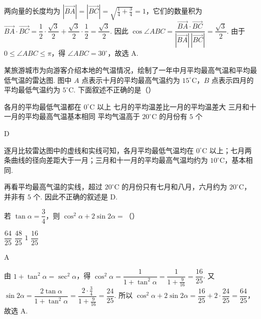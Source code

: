 \begin{solution}
两向量的长度均为 \(|\overrightarrow{BA}|=|\overrightarrow{BC}|=\sqrt{\frac14+\frac34}=1\)，它们的数量积为 \(\overrightarrow{BA}\cdot\overrightarrow{BC}=\dfrac12\cdot\dfrac{\sqrt3}{2}+\dfrac{\sqrt3}{2}\cdot\dfrac12=\dfrac{\sqrt3}{2}\). 因此 \(\cos\angle ABC=\dfrac{\overrightarrow{BA}\cdot\overrightarrow{BC}}{|\overrightarrow{BA}|\,|\overrightarrow{BC}|}=\dfrac{\sqrt3}{2}\). 由于 \(0\le\angle ABC\le\pi\)，得 \(\angle ABC=30^\circ\)，故选 A.
\end{solution}

\begin{problem}
某旅游城市为向游客介绍本地的气温情况，绘制了一年中月平均最高气温和平均最低气温的雷达图. 图中 \(A\) 点表示十月的平均最高气温约为 \(15^\circ\mathrm{C}\)，\(B\) 点表示四月的平均最低气温约为 \(5^\circ\mathrm{C}\). 下面叙述不正确的是（\quad）

\begingroup
{}
\endgroup

\choices
    {各月的平均最低气温都在 \(0^\circ\mathrm{C}\) 以上}
    {七月的平均温差比一月的平均温差大}
    {三月和十一月的平均最高气温基本相同}
    {平均气温高于 \(20^\circ\mathrm{C}\) 的月份有 \(5\) 个}
\end{problem}

\begin{answer}
D
\end{answer}

\begin{solution}
逐月比较雷达图中的虚线和实线可知，各月平均最低气温均在 \(0^\circ\mathrm{C}\) 以上；七月两条曲线的径向差距大于一月；三月和十一月的平均最高气温均约为 \(10^\circ\mathrm{C}\)，基本相同.

再看平均最高气温的实线，超过 \(20^\circ\mathrm{C}\) 的月份只有七月和八月，六月约为 \(20^\circ\mathrm{C}\)，并非有 \(5\) 个. 因此不正确的叙述是 D.
\end{solution}

\begin{problem}
若 \(\tan\alpha=\dfrac34\)，则 \(\cos^2\alpha+2\sin 2\alpha=\)（\quad）

\choices
    {\(\dfrac{64}{25}\)}
    {\(\dfrac{48}{25}\)}
    {\(1\)}
    {\(\dfrac{16}{25}\)}
\end{problem}

\begin{answer}
A
\end{answer}

\begin{solution}
由 \(1+\tan^2\alpha=\sec^2\alpha\)，得 \(\cos^2\alpha=\dfrac{1}{1+\tan^2\alpha}=\dfrac{1}{1+\frac{9}{16}}=\dfrac{16}{25}\). 又 \(\sin2\alpha=\dfrac{2\tan\alpha}{1+\tan^2\alpha}=\dfrac{2\cdot\frac34}{1+\frac{9}{16}}=\dfrac{24}{25}\). 所以 \(\cos^2\alpha+2\sin2\alpha=\dfrac{16}{25}+2\cdot\dfrac{24}{25}=\dfrac{64}{25}\)，故选 A.
\end{solution}

